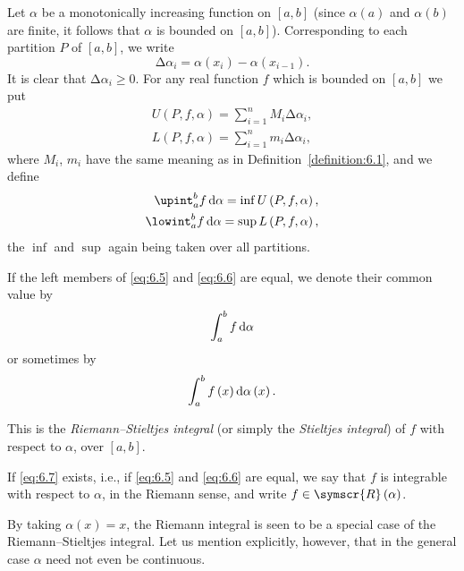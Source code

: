 \begin{definition}
    Let \(\alpha\) be a monotonically increasing function on \(\left[a,b\right]\) (since \(\alpha\left(a\right)\) and \(\alpha\left(b\right)\) are finite, it follows that \(\alpha\) is bounded on \(\left[a,b\right]\)). Corresponding to each partition \(P\) of \(\left[a,b\right]\), we write
    \begin{equation*}
        \increment\alpha_i=\alpha\left(x_i\right)-\alpha\left(x_{i-1}\right).
    \end{equation*}
    It is clear that \(\increment\alpha_i\geqslant0\). For any real function \(f\) which is bounded on \(\left[a,b\right]\) we put
    \begin{align*}
        U\left(P,f,\alpha\right)=\sum_{i=1}^nM_i\increment\alpha_i,\\
        L\left(P,f,\alpha\right)=\sum_{i=1}^nm_i\increment\alpha_i,
    \end{align*}
    where \(M_i\), \(m_i\) have the same meaning as in Definition~\ref{definition:6.1}, and we define
    \begin{align}
        \upint_a^bf\odif{\alpha}=\inf U\left(P,f,\alpha\right),\label{eq:6.5}\\
        \lowint_a^bf\odif{\alpha}=\sup L\left(P,f,\alpha\right),\label{eq:6.6}
    \end{align}
    the \(\inf\) and \(\sup\) again being taken over all partitions.

    If the left members of \eqref{eq:6.5} and \eqref{eq:6.6} are equal, we denote their common value by
    \begin{equation}
        \int_a^bf\odif{\alpha}\label{eq:6.7}
    \end{equation}
    or sometimes by
    \begin{equation}
        \int_a^bf\left(x\right)\odif{\alpha\left(x\right)}.\label{eq:6.8}
    \end{equation}

    This is the \emph{Riemann--Stieltjes integral} (or simply the \emph{Stieltjes integral}) of \(f\) with respect to \(\alpha\), over \(\left[a,b\right]\).

    If \eqref{eq:6.7} exists, i.e., if \eqref{eq:6.5} and \eqref{eq:6.6} are equal, we say that \(f\) is integrable with respect to \(\alpha\), in the Riemann sense, and write \(f\in\symscr{R}\left(\alpha\right)\).
\end{definition}

By taking \(\alpha\left(x\right)=x\), the Riemann integral is seen to be a special case of the Riemann--Stieltjes integral. Let us mention explicitly, however, that in the general case \(\alpha\) need not even be continuous.

